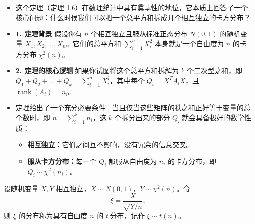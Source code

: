 \begin{note}
\begin{itemize}
    \item 这个定理（定理 1.6）在数理统计中具有奠基性的地位，它本质上回答了一个核心问题：什么时候我们可以把一个总平方和拆成几个相互独立的卡方分布？
    
    \item \textbf{1. 定理背景} 假设你有 $n$ 个相互独立且服从标准正态分布 $N(0,1)$ 的随机变量 $X_1,X_2,\dots,X_n$。它们的总平方和 $\sum_{i=1}^n X_i^2$ 本身就是一个自由度为 $n$ 的卡方分布 $\chi^2(n)$。
    
    \item \textbf{2. 定理的核心逻辑} 如果你试图将这个总平方和拆解为 $k$ 个二次型之和，即 $Q_1+Q_2+\dots+Q_k=\sum_{i=1}^n X_i^2$，其中每个 $Q_i=X^T A_i X$，且 $\operatorname{rank}(A_i)=n_i$。
    
    \item 定理给出了一个充分必要条件：当且仅当这些矩阵的秩之和正好等于变量的总个数时，即 $n=\sum_{i=1}^k n_i$，这 $k$ 个拆分出来的部分 $Q_i$ 就会具备极好的数学性质：
    \begin{itemize}
        \item \textbf{相互独立：}它们之间互不影响，没有冗余的信息交叉。
        \item \textbf{服从卡方分布：}每一个 $Q_i$ 都服从自由度为 $n_i$ 的卡方分布，即 $Q_i\sim \chi^2(n_i)$。
    \end{itemize}
\end{itemize}
\end{note}
\begin{definition}
设随机变量 $X,Y$ 相互独立，$X\sim N(0,1)$，$Y\sim \chi^2(n)$。令
\[
\xi=\frac{X}{\sqrt{Y/n}},
\]
则 $\xi$ 的分布称为具有自由度 $n$ 的 $t$ 分布，记作 $\xi\sim t(n)$。
\end{definition}
